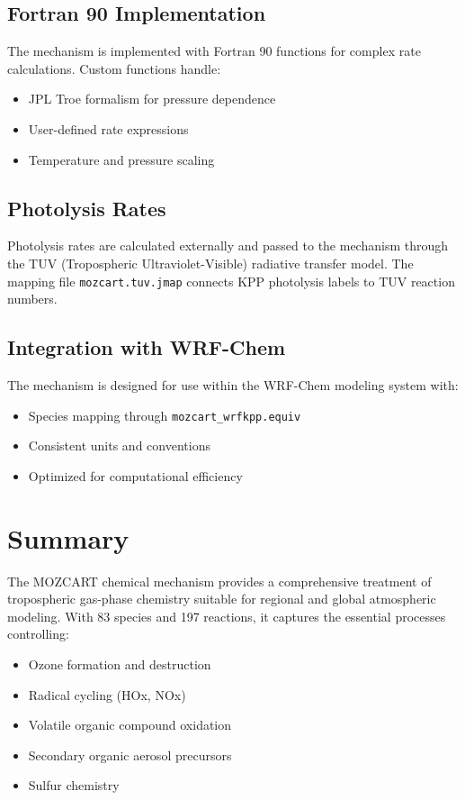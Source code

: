 \documentclass[12pt,a4paper]{article}
\begin{document}
\subsection{Fortran 90 Implementation}
The mechanism is implemented with Fortran 90 functions for complex rate calculations. Custom functions handle:
\begin{itemize}
    \item JPL Troe formalism for pressure dependence
    \item User-defined rate expressions
    \item Temperature and pressure scaling
\end{itemize}

\subsection{Photolysis Rates}
Photolysis rates are calculated externally and passed to the mechanism through the TUV (Tropospheric Ultraviolet-Visible) radiative transfer model. The mapping file \texttt{mozcart.tuv.jmap} connects KPP photolysis labels to TUV reaction numbers.

\subsection{Integration with WRF-Chem}
The mechanism is designed for use within the WRF-Chem modeling system with:
\begin{itemize}
    \item Species mapping through \texttt{mozcart\_wrfkpp.equiv}
    \item Consistent units and conventions
    \item Optimized for computational efficiency
\end{itemize}

\section{Summary}

The MOZCART chemical mechanism provides a comprehensive treatment of tropospheric gas-phase chemistry suitable for regional and global atmospheric modeling. With 83 species and 197 reactions, it captures the essential processes controlling:

\begin{itemize}
    \item Ozone formation and destruction
    \item Radical cycling (HOx, NOx)
    \item Volatile organic compound oxidation
    \item Secondary organic aerosol precursors
    \item Sulfur chemistry
\end{itemize}
\end{document}
